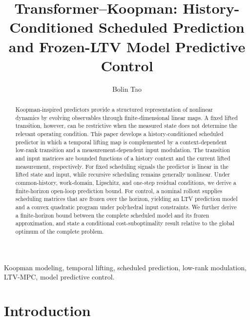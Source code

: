 \documentclass[journal]{IEEEtran}
\begin{document}
\title{Transformer--Koopman: History-Conditioned Scheduled Prediction and Frozen-LTV Model Predictive Control}
\author{Bolin Tao}
\maketitle

\begin{abstract}
Koopman-inspired predictors provide a structured representation of nonlinear dynamics by evolving observables through finite-dimensional linear maps. A fixed lifted transition, however, can be restrictive when the measured state does not determine the relevant operating condition. This paper develops a history-conditioned scheduled predictor in which a temporal lifting map is complemented by a context-dependent low-rank transition and a measurement-dependent input modulation. The transition and input matrices are bounded functions of a history context and the current lifted measurement, respectively. For fixed scheduling signals the predictor is linear in the lifted state and input, while recursive scheduling remains generally nonlinear. Under common-history, work-domain, Lipschitz, and one-step residual conditions, we derive a finite-horizon open-loop prediction bound. For control, a nominal rollout supplies scheduling matrices that are frozen over the horizon, yielding an LTV prediction model and a convex quadratic program under polyhedral input constraints. We further derive a finite-horizon bound between the complete scheduled model and its frozen approximation, and state a conditional cost-suboptimality result relative to the global optimum of the complete problem.
\end{abstract}

\begin{IEEEkeywords}
Koopman modeling, temporal lifting, scheduled prediction, low-rank modulation, LTV-MPC, model predictive control.
\end{IEEEkeywords}

\section{Introduction}
\label{sec:introduction}
\end{document}
